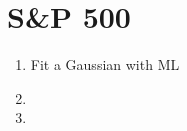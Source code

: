 \section{S\&P 500}

\begin{enumerate}[label=\textbf{\Alph*}.]
    \item Fit a Gaussian with ML

    \item 

    \item 

\end{enumerate}
